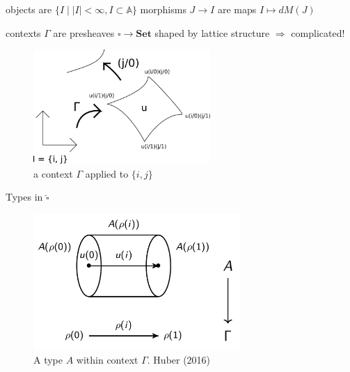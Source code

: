 \documentclass[english]{beamer}
\begin{document}
\begin{frame}
 


 
 \begin{definition}
 
  objects are $\{ I \mid |I| < \infty , I \subset \mathbb{A} \}$
  morphisms $J\rightarrow I$ are maps $I \mapsto dM(J)$ 
 
 \end{definition}
 
  \begin{example}
 contexts $\Gamma$ are presheaves $\square \rightarrow \mathbf{Set}$
 shaped by lattice structure $\Rightarrow$ complicated!
 
 \begin{figure}
 
 \includegraphics[width=0.6\textwidth]{figures/context}
 
  \caption{a context $\Gamma$ applied to $\{i,j\}$}
  \end{figure}
 \end{example}
 
\end{frame}

\begin{frame}{Types in $\widehat{\square}$}
 \begin{figure}
\centering
\includegraphics[width=0.7\textwidth]{figures/types}
\caption{A type $A$ within context $\Gamma$. Huber (2016)}
 \end{figure}
 
\end{frame}
\end{document}
